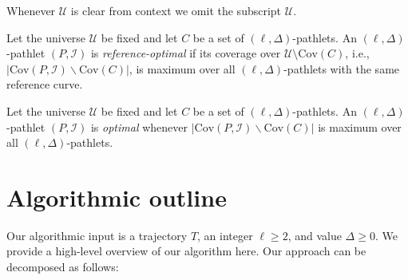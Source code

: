 \documentclass[a4paper,UKenglish,cleveref,thm-restate,notab]{lipics-v2021}
\newcommand{\I}{\mathcal{I}}
\newcommand{\U}{\mathcal{U}}
\newcommand{\Cov}{\ensuremath{\mathrm{Cov}}}
\begin{document}
\noindent
Whenever $\U$ is clear from context we omit the subscript $\U$.

    \begin{definition}
         Let the universe $\U$ be fixed and let $C$ be a set of $(\ell, \Delta)$-pathlets. An $(\ell, \Delta)$-pathlet $(P, \I)$ is \emph{reference-optimal} if its coverage over $\U \setminus \Cov(C)$, i.e., $|\Cov(P, \I) \backslash \Cov(C)|$, is maximum over all $(\ell, \Delta)$-pathlets with the same reference curve.
\end{definition}


\begin{definition}
    Let the universe $\U$ be fixed and let $C$ be a set of $(\ell, \Delta)$-pathlets.
        An $(\ell, \Delta)$-pathlet $(P, \I)$ is \emph{optimal} whenever $|\Cov(P, \I) \backslash \Cov(C)|$ is maximum over all $(\ell, \Delta)$-pathlets.
    \end{definition}



    \noindent
 
    
\section{Algorithmic outline}
\label{sec:outline}

    Our algorithmic input is a trajectory $T$, an integer $\ell \geq 2$, and value $\Delta \geq 0$.
    We provide a high-level overview of our algorithm here.   
    Our approach can be decomposed as follows:
    
\end{document}
